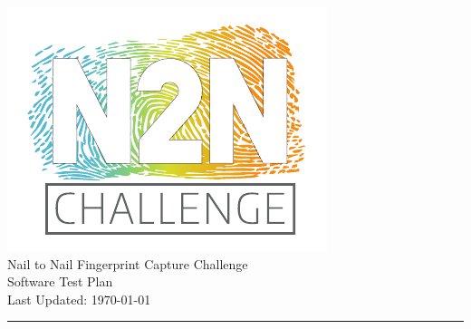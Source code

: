 \begin{center}
	\includegraphics{../assets/n2n_logo_white}\\
	\LARGE{Nail to Nail Fingerprint Capture Challenge}\\
	\Large{Software Test Plan}\\[2ex]
	\small{Last Updated: \today{}}
	\\[2ex]
\end{center}

\hrule

\tableofcontents

